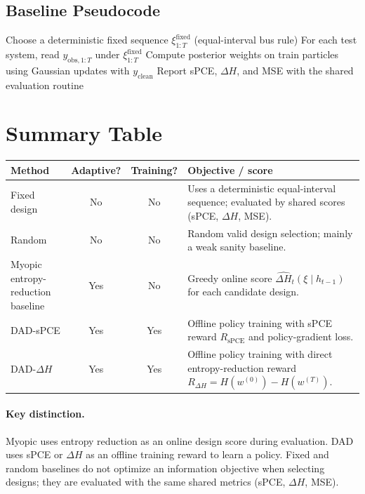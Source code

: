\documentclass[11pt]{article}
\begin{document}
\subsection{Baseline Pseudocode}

\begin{algorithm}[H]
\caption{Fixed Baseline Evaluation}
\begin{algorithmic}[1]
\State Choose a deterministic fixed sequence $\xi_{1:T}^{\mathrm{fixed}}$ (equal-interval bus rule)
\State For each test system, read $y_{\mathrm{obs},1:T}$ under $\xi_{1:T}^{\mathrm{fixed}}$
\State Compute posterior weights on train particles using Gaussian updates with $y_{\mathrm{clean}}$
\State Report sPCE, $\Delta H$, and MSE with the shared evaluation routine
\end{algorithmic}
\end{algorithm}

\section{Summary Table}

\begin{table}[h]
\centering
\renewcommand{\arraystretch}{1.25}
\begin{tabular}{p{3.2cm}ccp{6.6cm}}
\toprule
Method & Adaptive? & Training? & Objective / score \\
\midrule
Fixed design & No & No & Uses a deterministic equal-interval sequence; evaluated by shared scores (sPCE, $\Delta H$, MSE). \\
Random & No & No & Random valid design selection; mainly a weak sanity baseline. \\
Myopic entropy-reduction baseline & Yes & No & Greedy online score $\widehat{\Delta H}_t(\xi\mid h_{t-1})$ for each candidate design. \\
DAD-sPCE & Yes & Yes & Offline policy training with sPCE reward $R_{\mathrm{sPCE}}$ and policy-gradient loss. \\
DAD-$\Delta H$ & Yes & Yes & Offline policy training with direct entropy-reduction reward $R_{\Delta H}=H(w^{(0)})-H(w^{(T)})$. \\
\bottomrule
\end{tabular}
\end{table}

\paragraph{Key distinction.}
Myopic uses entropy reduction as an online design score during evaluation. DAD uses sPCE or $\Delta H$ as an offline training reward to learn a policy. Fixed and random baselines do not optimize an information objective when selecting designs; they are evaluated with the same shared metrics (sPCE, $\Delta H$, MSE).
\end{document}
